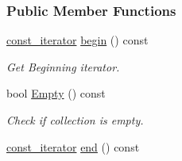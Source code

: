 \subsubsection*{Public Member Functions}
\begin{DoxyCompactItemize}
\item 
\hyperlink{classphys_1_1xml_1_1XPathNode}{const\_\-iterator} \hyperlink{classphys_1_1xml_1_1XPathNodeSet_a887d84cf19f5d2155ab9153bc02e8d1e}{begin} () const 
\begin{DoxyCompactList}\small\item\em Get Beginning iterator. \item\end{DoxyCompactList}\item 
bool \hyperlink{classphys_1_1xml_1_1XPathNodeSet_a91fa85dbf474c51bc7a9df1baf38d43a}{Empty} () const 
\begin{DoxyCompactList}\small\item\em Check if collection is empty. \item\end{DoxyCompactList}\item 
\hypertarget{classphys_1_1xml_1_1XPathNodeSet_a1b5507aca9b87bbaa0c698f293ae8fd4}{
\hyperlink{classphys_1_1xml_1_1XPathNode}{const\_\-iterator} \hyperlink{classphys_1_1xml_1_1XPathNodeSet_a1b5507aca9b87bbaa0c698f293ae8fd4}{end} () const }
\label{classphys_1_1xml_1_1XPathNodeSet_a1b5507aca9b87bbaa0c698f293ae8fd4}


\end{DoxyCompactItemize}
